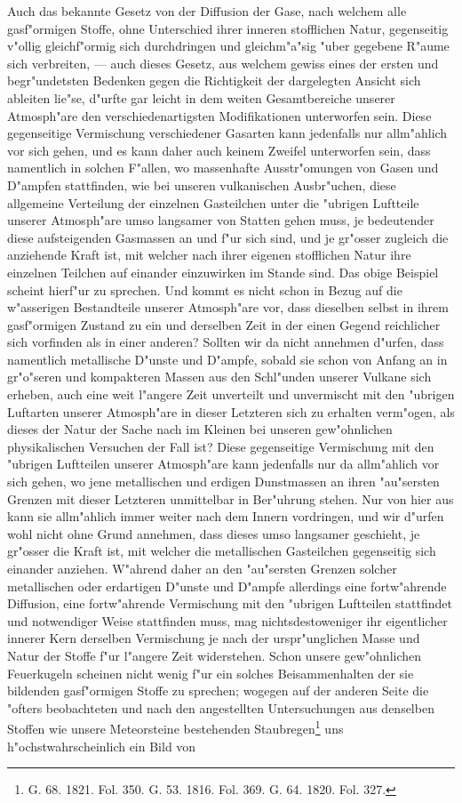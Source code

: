 \documentclass[a4paper, 8pt, oneside, polutonikogreek, german]{article}
\begin{document}
Auch das bekannte Gesetz von der Diffusion der Gase, nach welchem alle gasf"ormigen Stoffe, ohne Unterschied ihrer inneren stofflichen Natur, gegenseitig v"ollig gleichf"ormig sich durchdringen und gleichm"a"sig "uber gegebene R"aume sich verbreiten, --- auch dieses Gesetz, aus welchem gewiss eines der ersten und begr"undetsten Bedenken gegen die Richtigkeit der dargelegten Ansicht sich ableiten lie"se, d"urfte gar leicht in dem weiten Gesamtbereiche unserer Atmosph"are den verschiedenartigsten Modifikationen unterworfen sein. Diese gegenseitige Vermischung verschiedener Gasarten kann jedenfalls nur allm"ahlich vor sich gehen, und es kann daher auch keinem Zweifel unterworfen sein, dass namentlich in solchen F"allen, wo massenhafte Ausstr"omungen von Gasen und D"ampfen stattfinden, wie bei unseren vulkanischen Ausbr"uchen, diese allgemeine Verteilung der einzelnen Gasteilchen unter die "ubrigen Luftteile unserer Atmosph"are umso langsamer von Statten gehen muss, je bedeutender diese aufsteigenden Gasmassen an und f"ur sich sind, und je gr"osser zugleich die anziehende Kraft ist, mit welcher nach ihrer eigenen stofflichen Natur ihre einzelnen Teilchen auf einander einzuwirken im Stande sind. Das obige Beispiel scheint hierf"ur zu sprechen. Und kommt es nicht schon in Bezug auf die w"asserigen Bestandteile unserer Atmosph"are vor, dass dieselben selbst in ihrem gasf"ormigen Zustand zu ein und derselben Zeit in der einen Gegend reichlicher sich vorfinden als in einer anderen? Sollten wir da nicht annehmen d"urfen, dass namentlich metallische D"unste und D"ampfe, sobald sie schon von Anfang an in gr"o"seren und kompakteren Massen aus den Schl"unden unserer Vulkane sich erheben, auch eine weit l"angere Zeit unverteilt und unvermischt mit den "ubrigen Luftarten unserer Atmosph"are in dieser Letzteren sich zu erhalten verm"ogen, als dieses der Natur der Sache nach im Kleinen bei unseren gew"ohnlichen physikalischen Versuchen der Fall ist? Diese gegenseitige Vermischung mit den "ubrigen Luftteilen unserer Atmosph"are kann jedenfalls nur da allm"ahlich vor sich gehen, wo jene metallischen und erdigen Dunstmassen an ihren "au"sersten Grenzen mit dieser Letzteren unmittelbar in Ber"uhrung stehen. Nur von hier aus kann sie allm"ahlich immer weiter nach dem Innern vordringen, und wir d"urfen wohl nicht ohne Grund annehmen, dass dieses umso langsamer geschieht, je gr"osser die Kraft ist, mit welcher die metallischen Gasteilchen gegenseitig sich einander anziehen. W"ahrend daher an den "au"sersten Grenzen solcher metallischen oder erdartigen D"unste und D"ampfe allerdings eine fortw"ahrende Diffusion, eine fortw"ahrende Vermischung mit den "ubrigen Luftteilen stattfindet und notwendiger Weise stattfinden muss, mag nichtsdestoweniger ihr eigentlicher innerer Kern derselben Vermischung je nach der urspr"unglichen Masse und Natur der Stoffe f"ur l"angere Zeit widerstehen. Schon unsere gew"ohnlichen Feuerkugeln scheinen nicht wenig f"ur ein solches Beisammenhalten der sie bildenden gasf"ormigen Stoffe zu sprechen; wogegen auf der anderen Seite die "ofters beobachteten und nach den angestellten Untersuchungen aus denselben Stoffen wie unsere Meteorsteine bestehenden Staubregen\footnote{G. 68. 1821. Fol. 350. G. 53. 1816. Fol. 369. G. 64. 1820. Fol. 327.} uns h"ochstwahrscheinlich ein Bild von 
\end{document}
